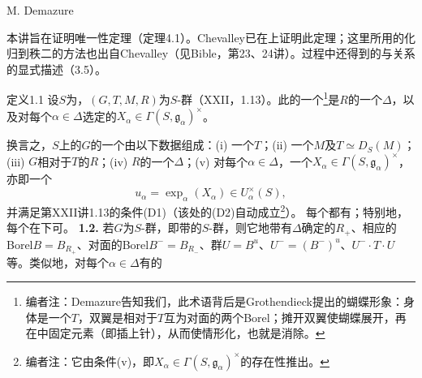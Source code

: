 \begin{center}M. Demazure\end{center}
本讲旨在证明唯一性定理（定理4.1）。Chevalley已在上证明此定理；这里所用的化归到秩二的方法也出自Chevalley（见Bible，第23、24讲）。过程中还得到的与关系的显式描述（3.5）。
\begin{SGAresult}{定义}{1.1}
设$S$为，$(G,T,M,R)$为$S$-群（XXII，1.13）。此的一个\footnote{编者注：Demazure告知我们，此术语背后是Grothendieck提出的蝴蝶形象：身体是一个$T$，双翼是相对于$T$互为对面的两个Borel；摊开双翼使蝴蝶展开，再在中固定元素（即插上针），从而使情形化，也就是消除。}是$R$的一个$\Delta$，以及对每个$\alpha\in\Delta$选定的$X_\alpha\in\Gamma(S,\mathfrak g_\alpha)^\times$。
\end{SGAresult}
换言之，$S$上的$G$的一个由以下数据组成：(i) 一个$T$；(ii) 一个$M$及$T\simeq D_S(M)$；(iii) $G$相对于$T$的$R$；(iv) $R$的一个$\Delta$；(v) 对每个$\alpha\in\Delta$，一个$X_\alpha\in\Gamma(S,\mathfrak g_\alpha)^\times$，亦即一个
\[u_\alpha=\exp_\alpha(X_\alpha)\in U_\alpha^\times(S),\]
并满足第XXII讲1.13的条件(D1)（该处的(D2)自动成立\footnote{编者注：它由条件(v)，即$X_\alpha\in\Gamma(S,\mathfrak g_\alpha)^\times$的存在性推出。}）。
每个都有；特别地，每个在下可。
\textbf{1.2.} 若$G$为$S$-群，即带的$S$-群，则它地带有$\Delta$确定的$R_+$、相应的Borel$B=B_{R_+}$、对面的Borel$B^-=B_{R_-}$、群$U=B^u$、$U^-=(B^-)^u$、$U^-\cdot T\cdot U$等。类似地，对每个$\alpha\in\Delta$有的
